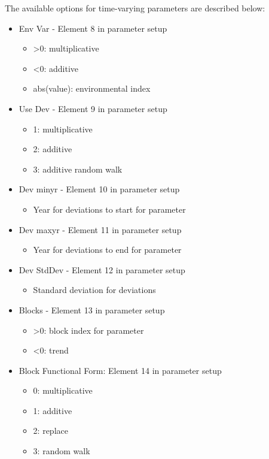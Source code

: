 The available options for time-varying parameters are described below:
\begin{itemize}
	\item Env Var - Element 8 in parameter setup
		\begin{itemize}
			\item >0: multiplicative
			\item <0: additive
			\item abs(value): environmental index
		\end{itemize}
	\item Use Dev - Element 9 in parameter setup
	\begin{itemize}
		\item 1: multiplicative
		\item 2: additive
		\item 3: additive random walk
	\end{itemize}
	\item Dev minyr - Element 10 in parameter setup
	\begin{itemize}
		\item Year for deviations to start for parameter
	\end{itemize}
	\item Dev maxyr - Element 11 in parameter setup
		\begin{itemize}
			\item Year for deviations to end for parameter
		\end{itemize}
	\item Dev StdDev - Element 12 in parameter setup
		\begin{itemize}
			\item Standard deviation for deviations
		\end{itemize}
	\item Blocks - Element 13 in parameter setup
		\begin{itemize}
			\item >0: block index for parameter
			\item <0: trend
		\end{itemize}
	\item Block Functional Form: Element 14 in parameter setup
		\begin{itemize}
			\item 0: multiplicative
			\item 1: additive
			\item 2: replace
			\item 3: random walk
		\end{itemize}
\end{itemize}
